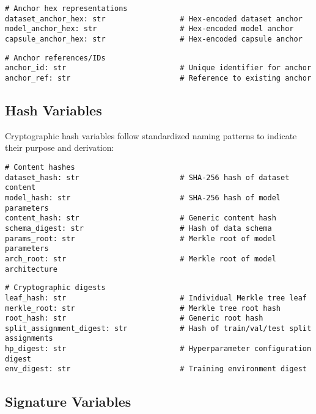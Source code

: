 \documentclass[12pt,a4paper]{article}
\begin{document}
\begin{lstlisting}[caption=Anchor Hex Representations]
# Anchor hex representations
dataset_anchor_hex: str                 # Hex-encoded dataset anchor
model_anchor_hex: str                   # Hex-encoded model anchor
capsule_anchor_hex: str                 # Hex-encoded capsule anchor
\end{lstlisting}

\begin{lstlisting}[caption=Anchor References and IDs]
# Anchor references/IDs
anchor_id: str                          # Unique identifier for anchor
anchor_ref: str                         # Reference to existing anchor
\end{lstlisting}

\subsection{Hash Variables}

Cryptographic hash variables follow standardized naming patterns to indicate their purpose and derivation:

\begin{lstlisting}[caption=Content Hashes]
# Content hashes
dataset_hash: str                       # SHA-256 hash of dataset content
model_hash: str                         # SHA-256 hash of model parameters
content_hash: str                       # Generic content hash
schema_digest: str                      # Hash of data schema
params_root: str                        # Merkle root of model parameters
arch_root: str                          # Merkle root of model architecture
\end{lstlisting}

\begin{lstlisting}[caption=Cryptographic Digests]
# Cryptographic digests
leaf_hash: str                          # Individual Merkle tree leaf
merkle_root: str                        # Merkle tree root hash
root_hash: str                          # Generic root hash
split_assignment_digest: str            # Hash of train/val/test split assignments
hp_digest: str                          # Hyperparameter configuration digest
env_digest: str                         # Training environment digest
\end{lstlisting}

\subsection{Signature Variables}
\end{document}

